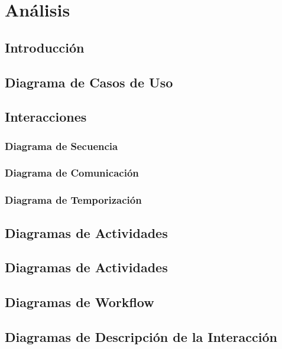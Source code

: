 \chapter{Análisis}

\section{Introducción}

\newpage

\section{Diagrama de Casos de Uso}

\newpage

\section{Interacciones}

\newpage

\subsection{Diagrama de Secuencia}

\newpage

\subsection{Diagrama de Comunicación}

\newpage

\subsection{Diagrama de Temporización}

\newpage

\section{Diagramas de Actividades}

\newpage

\section{Diagramas de Actividades}

\newpage

\section{Diagramas de Workflow}

\newpage

\section{Diagramas de Descripción de la Interacción}

\newpage
